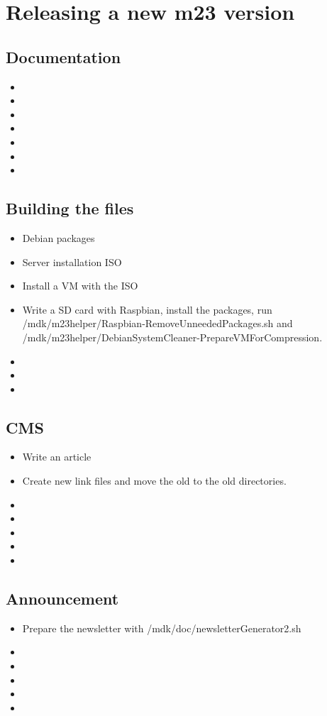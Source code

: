 \section{Releasing a new m23 version}

\subsection{Documentation}
\begin{itemize}
\item 
\item 
\item 
\item 
\item 
\item 
\item 
\end{itemize}



\subsection{Building the files}
\begin{itemize}
\item Debian packages
\item Server installation ISO
\item Install a VM with the ISO
\item Write a SD card with Raspbian, install the packages, run /mdk/m23helper/Raspbian-RemoveUnneededPackages.sh and /mdk/m23helper/DebianSystemCleaner-PrepareVMForCompression.
\item 
\item 
\item 
\end{itemize}


\subsection{CMS}
\begin{itemize}
\item Write an article
\item Create new link files and move the old to the old directories.
\item 
\item 
\item 
\item 
\item 
\end{itemize}


\subsection{Announcement}
\begin{itemize}
\item Prepare the newsletter with /mdk/doc/newsletterGenerator2.sh
\item 
\item 
\item 
\item 
\item 
\end{itemize}

